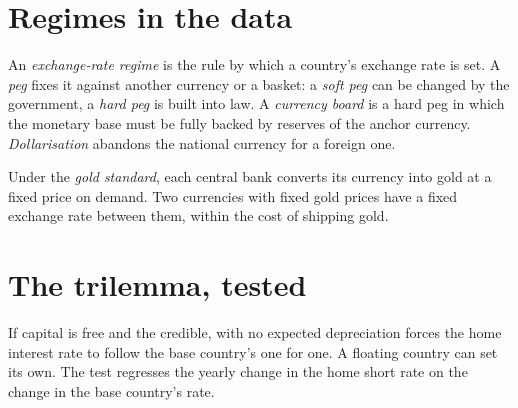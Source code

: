 \section{Regimes in the data}\label{sec:b3:exchange-rate-regimes:regimes}

\begin{definition}\label{def:b3:exchange-rate-regimes:regimes}
An \emph{exchange-rate regime} is the rule by which a country's exchange rate is
set. A \emph{peg} fixes it against another currency or a basket: a \emph{soft peg}
can be changed by the government, a \emph{hard peg} is built into law. A
\emph{currency board} is a hard peg in which the monetary base must be fully
backed by reserves of the anchor currency. \emph{Dollarisation} abandons the
national currency for a foreign one.
\end{definition}

\begin{definition}\label{def:b3:exchange-rate-regimes:gold-standard}
Under the \emph{gold standard}, each central bank converts its currency into gold
at a fixed price on demand. Two currencies with fixed gold prices have a fixed
exchange rate between them, within the cost of shipping gold.
\end{definition}

\section{The trilemma, tested}\label{sec:b3:exchange-rate-regimes:trilemma}

If capital is free and the  credible,  with no
expected depreciation forces the home interest rate to follow the base country's
one for one. A floating country can set its own. The test regresses the yearly
change in the home short rate on the change in the base country's rate.

